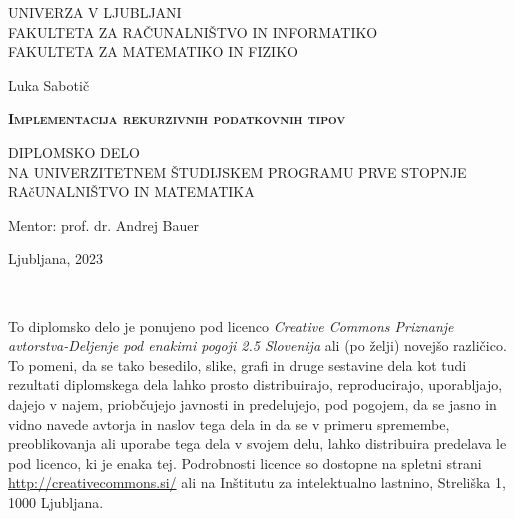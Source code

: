\documentclass[12pt,a4paper,openany]{book}
\begin{document}
\thispagestyle{empty} 

\begin{center}
{\large 
UNIVERZA V LJUBLJANI\\
FAKULTETA ZA RAČUNALNIŠTVO IN INFORMATIKO\\
FAKULTETA ZA MATEMATIKO IN FIZIKO\\
}

\vspace{3cm}
{\LARGE Luka Sabotič}\\

\vspace{2cm}
{\LARGE
\textsc{\textbf{Implementacija rekurzivnih podatkovnih tipov}}\par}

\vspace{2cm}
{ DIPLOMSKO DELO}\\
{ NA UNIVERZITETNEM ŠTUDIJSKEM PROGRAMU PRVE STOPNJE RAčUNALNIŠTVO IN MATEMATIKA\\
}

\vspace{2cm} 
{\Large Mentor: prof. dr. Andrej Bauer}

\vfill
{\Large Ljubljana, 2023}
\end{center}

\newpage

\ \thispagestyle{empty}

\newpage


\thispagestyle{empty}

\vspace*{5cm}
{\small \noindent
To diplomsko delo je ponujeno pod licenco \textit{Creative Commons Priznanje avtorstva-Deljenje pod enakimi pogoji 2.5 Slovenija}
ali (po želji) novejšo različico.
To pomeni, da se tako besedilo, slike, grafi in druge sestavine dela kot tudi rezultati diplomskega dela lahko prosto distribuirajo,
reproducirajo, uporabljajo, dajejo v najem, priobčujejo javnosti in predelujejo, pod pogojem, da se jasno in vidno navede avtorja in naslov tega
dela in da se v primeru spremembe, preoblikovanja ali uporabe tega dela v svojem delu, lahko distribuira predelava le pod
licenco, ki je enaka tej.
Podrobnosti licence so dostopne na spletni strani \url{http://creativecommons.si/} ali na Inštitutu za
intelektualno lastnino, Streliška 1, 1000 Ljubljana.

\begin{center}%
  \hspace*{1ex}
\end{center}
}
\end{document}

